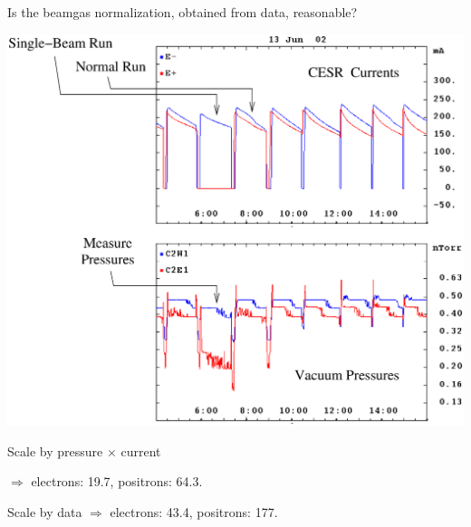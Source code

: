 \begin{slide*}

\slideframe{}
\huge
{}

\begin{minipage}[t]{\linewidth}
\huge

Is the beamgas normalization, obtained from data, reasonable?

\vspace{0.5 cm}

\begin{center}
  \includegraphics[width=0.7\linewidth]{beamgas_norm_is_reasonable.eps}
\end{center}

Scale by pressure $\times$ current
\begin{flushright}
$\Rightarrow$ electrons: 19.7, positrons: 64.3.
\end{flushright}

Scale by data $\Rightarrow$ electrons: 43.4, positrons: 177.

\end{minipage}

\end{slide*}



